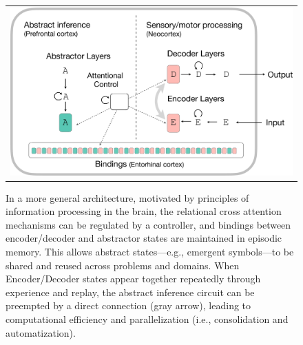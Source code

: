 \begin{figure}[t]
    \vspace{-3mm}
    \begin{center}
    \begin{tabular}{c}
        \hskip2pt\includegraphics[width=.60\textwidth]{figures/algorithm-diagram2-crop} 
    \end{tabular}
    \caption{In a more general architecture, motivated by principles of information processing 
    in the brain, the relational cross attention mechanisms can be regulated by a controller, and bindings between encoder/decoder and abstractor states are maintained in episodic memory. This allows abstract states---e.g., emergent symbols---to be shared and reused across problems and domains. When Encoder/Decoder states appear together repeatedly through experience and replay, the abstract inference circuit can be preempted by a direct connection (gray arrow), leading to computational efficiency and parallelization (i.e., consolidation and automatization).
    }
    \label{fig:algo2}
    \vskip-12pt
    \end{center}
\end{figure}



